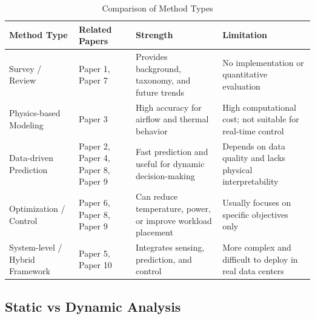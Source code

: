 \documentclass[12pt,a4paper]{article}
\begin{document}
                \begin{table}[H]
                    \centering
                    \small
                    \caption{Comparison of Method Types}
                    \label{tab:method_comparison}
                    \begin{tabular}{p{3cm} p{4cm} p{4cm} p{4cm}}
                    \toprule
                         Method Type & Related Papers & Strength & Limitation \\
                    \midrule
                    Survey / Review & Paper 1, Paper 7 & Provides background, taxonomy, and future trends & No implementation or quantitative evaluation \\
                    
                    Physics-based Modeling & Paper 3 & High accuracy for airflow and thermal behavior & High computational cost; not suitable for real-time control \\
                    
                    Data-driven Prediction & Paper 2, Paper 4, Paper 8, Paper 9 & Fast prediction and useful for dynamic decision-making & Depends on data quality and lacks physical interpretability \\
                    
                    Optimization / Control & Paper 6, Paper 8, Paper 9 & Can reduce temperature, power, or improve workload placement & Usually focuses on specific objectives only \\
                    
                    System-level / Hybrid Framework & Paper 5, Paper 10 & Integrates sensing, prediction, and control & More complex and difficult to deploy in real data centers \\
                    \bottomrule
                    \end{tabular}
                \end{table}
                
    \subsection{Static vs Dynamic Analysis}
\end{document}
